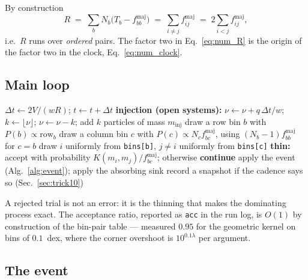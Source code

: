 \documentclass[a4paper,12pt]{article}
\newcommand{\minj}{m_{\mathrm{inj}}}
\newcommand{\fmaj}{f^{\mathrm{maj}}}
\newcommand{\code}[1]{\texttt{#1}}
\begin{document}
By construction
\begin{equation}
  R \;=\; \sum_b N_b\bigl(T_b - \fmaj_{bb}\bigr)
    \;=\; \sum_{i \neq j} \fmaj_{ij}
    \;=\; 2 \sum_{i<j} \fmaj_{ij},
  \label{eq:num_R}
\end{equation}
i.e.\ $R$ runs over \emph{ordered} pairs. The factor two in
Eq.~\eqref{eq:num_R} is the origin of the factor two in the clock,
Eq.~\eqref{eq:num_clock}.

\subsection{Main loop}

\begin{algorithm}[h]
\caption{Main loop: one majorant trial}
\label{alg:mainloop}
\begin{algorithmic}[1]
  \State $\Delta t \gets 2V/(wR)$; \quad $t \gets t + \Delta t$
  \State \textbf{injection (open systems):}
         $\nu \gets \nu + q\,\Delta t / w$; \quad
         $k \gets \lfloor \nu \rfloor$; \quad $\nu \gets \nu - k$;
         add $k$ particles of mass $\minj$
  \State draw a row bin $b$ with $P(b) \propto \text{row}_b$
  \State draw a column bin $c$ with
         $P(c) \propto N_c \fmaj_{bc}$, using $(N_b-1)\fmaj_{bb}$ for $c=b$
  \State draw $i$ uniformly from \code{bins[b]}, $j \neq i$ uniformly from \code{bins[c]}
  \State \textbf{thin:} accept with probability $K(m_i,m_j)/\fmaj_{bc}$;
         otherwise \textbf{continue} 
  \State apply the event (Alg.~\ref{alg:event}); apply the absorbing sink
  \State record a snapshot if the cadence says so (Sec.~\ref{sec:trick10})
\EndWhile
\end{algorithmic}
\end{algorithm}

A rejected trial is not an error: it is the thinning that makes the
dominating process exact. The acceptance ratio, reported as \code{acc} in
the run log, is $O(1)$ by construction of the bin-pair table --- measured
$0.95$ for the geometric kernel on bins of $0.1$~dex, where the corner
overshoot is $10^{0.1\lambda}$ per argument.

\subsection{The event}
\end{document}
